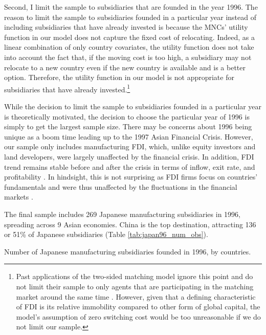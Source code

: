 Second, I limit the sample to subsidiaries that are founded in the year 1996. The
reason to limit the sample to subsidiaries founded in a particular year instead
of including subsidiaries that have already invested is because the MNCs'
utility function in our model does not capture the fixed cost of relocating.
Indeed, as a linear combination of only country covariates, the utility function
does not take into account the fact that, if the moving cost is too high, a
subsidiary may not relocate to a new country even if the new country is
available and is a better option. Therefore, the utility function in our model
is not appropriate for subsidiaries that have already invested.\footnote{Past
applications of the two-sided matching model ignore this point and do not limit
their sample to only agents that are participating in the matching market around
the same time \citep{Logan1996, Logan2008}. However, given that a defining
characteristic of FDI is its relative immobility compared to other form of
global capital, the model's assumption of zero switching cost would be too
unreasonable if we do not limit our sample.}

While the decision to limit the sample to subsidiaries founded in a particular
year is theoretically motivated, the decision to choose the particular year of
1996 is simply to get the largest sample size. There may be concerns about 1996
being unique as a boom time leading up to the 1997 Asian Financial Crisis.
However, our sample only includes manufacturing FDI, which, unlike equity
investors and land developers, were largely unaffected by the financial crisis.
In addition, FDI trend remains stable before and after the crisis in terms of
inflow, exit rate, and profitability \citep{Delios2001, UNCTAD1998}. In
hindsight, this is not surprising as FDI firms focus on countries' fundamentals
and were thus unaffected by the fluctuations in the financial markets
\citep{Ahlquist2006}.

The final sample includes 269 Japanese manufacturing subsidiaries in 1996, spreading
across 9 Asian economies. China is the top destination, attracting 136 or 51\%
of Japanese subsidiaries (Table \ref{tab:japan96_num_obs}).

\begin{table}[tbp]
  \centering
  \caption[Number of Japanese manufacturing subsidiaries founded in 1996, by
  countries.]{Number of Japanese manufacturing subsidiaries founded in 1996, by countries.}
  \label{tab:japan96_num_obs}
  
\end{table}

